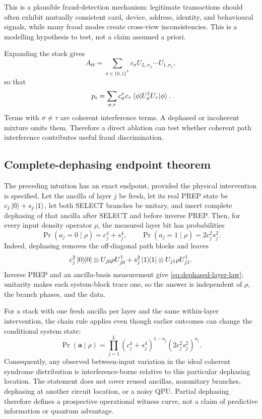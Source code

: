 \documentclass[11pt,a4paper]{article}
\newcommand{\psucc}{p_{\mathrm{s}}}
\begin{document}
This is a plausible fraud-detection mechanism: legitimate transactions should often exhibit mutually consistent card, device, address, identity, and behavioural signals, while many fraud modes create cross-view inconsistencies. This is a modelling hypothesis to test, not a claim assumed a priori.

Expanding the stack gives
\begin{equation}
A_\Theta
=
\sum_{\sigma\in\{0,1\}^L}
 c_\sigma
 U_{L,\sigma_L}\cdots U_{1,\sigma_1},
\end{equation}
so that
\begin{equation}
\psucc
=
\sum_{\sigma,\tau}
 c_\sigma^*c_\tau
 \mel{\phi}{U_\sigma^\dagger U_\tau}{\phi}.
\end{equation}
Terms with $\sigma\neq\tau$ are coherent interference terms. A dephased or incoherent mixture omits them. Therefore a direct ablation can test whether coherent path interference contributes useful fraud discrimination.

\subsection{Complete-dephasing endpoint theorem}

The preceding intuition has an exact endpoint, provided the physical
intervention is specified. Let the ancilla of layer $j$ be fresh, let its real
PREP state be $c_j\ket{0}+s_j\ket{1}$, let both SELECT branches be unitary,
and insert complete dephasing of that ancilla after SELECT and before inverse
PREP. Then, for every input density operator $\rho$, the measured layer bit
has probabilities
\begin{equation}
 \Pr(a_j=0\mid\rho)=c_j^4+s_j^4,\qquad
 \Pr(a_j=1\mid\rho)=2c_j^2s_j^2.
 \label{eq:dephased-layer-law}
\end{equation}
Indeed, dephasing removes the off-diagonal path blocks and leaves
\begin{equation}
 c_j^2\ketbra{0}{0}\otimes U_{j0}\rho U_{j0}^\dagger
 +s_j^2\ketbra{1}{1}\otimes U_{j1}\rho U_{j1}^\dagger.
\end{equation}
Inverse PREP and an ancilla-basis measurement give
\eqref{eq:dephased-layer-law}; unitarity makes each system-block trace one, so
the answer is independent of $\rho$, the branch phases, and the data.

For a stack with one fresh ancilla per layer and the same within-layer
intervention, the chain rule applies even though earlier outcomes can change
the conditional system state:
\begin{equation}
 \boxed{\Pr(\mathbf a\mid\rho)=
 \prod_{j=1}^{L}
 (c_j^4+s_j^4)^{1-a_j}(2c_j^2s_j^2)^{a_j}.}
 \label{eq:dephased-stack-law}
\end{equation}
Consequently, any observed between-input variation in the ideal coherent
syndrome distribution is interference-borne relative to this particular
dephasing location. The statement does not cover reused ancillas, nonunitary
branches, dephasing at another circuit location, or a noisy QPU. Partial
dephasing therefore defines a prospective operational witness curve, not a
claim of predictive information or quantum advantage.
\end{document}

